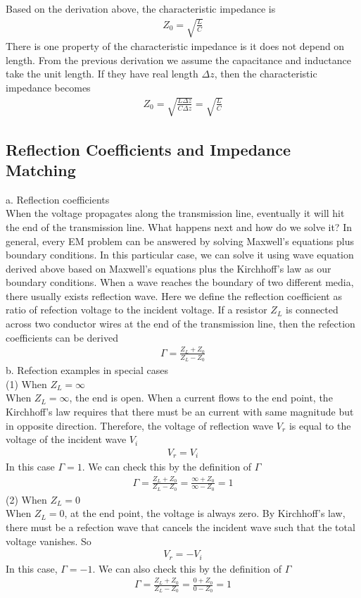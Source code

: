 \documentclass[a4paper]{article}
\begin{document}
Based on the derivation above, the characteristic impedance is 
\begin{align*}
	Z_0 = \sqrt{\frac{L}{C}}
\end{align*}
There is one property of the characteristic impedance is it does not depend on length. From the previous derivation we assume the capacitance and inductance take the unit length. If they have real length  $\Delta z$, then the characteristic impedance becomes
\begin{align*}
	Z_0 = \sqrt{\frac{L \Delta z}{C \Delta z}} = \sqrt{\frac{L}{C}}
\end{align*}
\subsection{Reflection Coefficients and Impedance Matching}
{a. Reflection coefficients}\\
When the voltage propagates along the transmission line, eventually it will hit the end of the transmission line. What happens next and how do we solve it? In general, every EM problem can be answered by solving Maxwell's equations plus boundary conditions. In this particular case, we can solve it using wave equation derived above based on Maxwell's equations plus the Kirchhoff's law as our boundary conditions. When a wave reaches the boundary of two different media, there usually exists reflection wave. Here we define the reflection coefficient as ratio of refection voltage to the incident voltage. If a resistor $Z_L$ is connected across two conductor wires at the end of the transmission line, then the refection coefficients can be derived
\begin{align*}
	\Gamma = \frac{Z_L + Z_0}{Z_L - Z_0}
\end{align*}
{b. Refection examples in special cases}\\
(1) When $Z_L = \infty$\\
When $Z_L = \infty$, the end is open. When a current flows to the end point, the Kirchhoff's law requires that there must be an current with same magnitude but in opposite direction. Therefore, the voltage of reflection wave $V_r$ is equal to the voltage of the incident wave $V_i$
\begin{align*}
	V_r = V_i
\end{align*}
In this case $\Gamma = 1$. We can check this by the definition of $\Gamma$
\begin{align*}
	\Gamma = \frac{Z_L + Z_0}{Z_L - Z_0} = \frac{\infty + Z_0}{\infty - Z_0} = 1
\end{align*}
(2) When $Z_L = 0$\\
When $Z_L = 0$, at the end point, the voltage is always zero. By Kirchhoff's law, there must be a refection wave that cancels the incident wave such that the total voltage vanishes. So\\
\begin{align*}
	V_r = - V_i
\end{align*}
In this case, $\Gamma = -1$. We can also check this by the definition of $\Gamma$
\begin{align*}
	\Gamma = \frac{Z_L + Z_0}{Z_L - Z_0} = \frac{0 + Z_0}{0 - Z_0} = 1
\end{align*}
\end{document}
